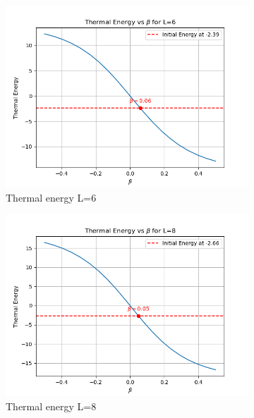 \documentclass[12pt]{article}
\begin{document}
\begin{figure}[htbp]
    \centering
    \begin{subfigure}[b]{0.32\textwidth}
        \includegraphics[width=\textwidth]{p4_3_1_thermal_energy_intersection_L6.png}
        \caption{Thermal energy L=6}
    \end{subfigure}
    \begin{subfigure}[b]{0.32\textwidth}
        \includegraphics[width=\textwidth]{p4_3_1_thermal_energy_intersection_L8.png}
        \caption{Thermal energy L=8}
    \end{subfigure}
    \begin{subfigure}[b]{0.32\textwidth}

\end{subfigure}
\end{figure}
\end{document}
